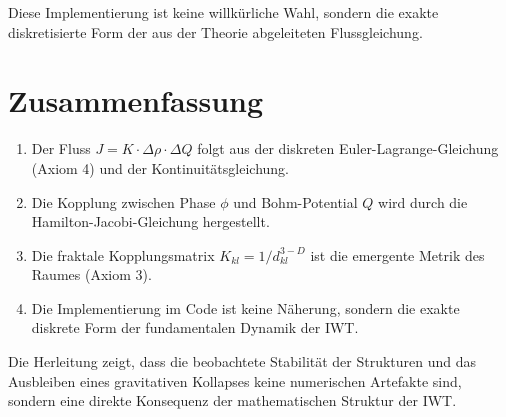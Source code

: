 Diese Implementierung ist keine willkürliche Wahl, sondern die exakte diskretisierte Form 
der aus der Theorie abgeleiteten Flussgleichung.

\section{Zusammenfassung}

\begin{enumerate}
    \item Der Fluss \( J = K \cdot \Delta \rho \cdot \Delta Q \) folgt aus der 
    diskreten Euler-Lagrange-Gleichung (Axiom 4) und der Kontinuitätsgleichung.
    \item Die Kopplung zwischen Phase \( \phi \) und Bohm-Potential \( Q \) 
    wird durch die Hamilton-Jacobi-Gleichung hergestellt.
    \item Die fraktale Kopplungsmatrix \( K_{kl} = 1/d_{kl}^{3-D} \) ist die 
    emergente Metrik des Raumes (Axiom 3).
    \item Die Implementierung im Code ist keine Näherung, sondern die exakte 
    diskrete Form der fundamentalen Dynamik der IWT.
\end{enumerate}

Die Herleitung zeigt, dass die beobachtete Stabilität der Strukturen und das 
Ausbleiben eines gravitativen Kollapses keine numerischen Artefakte sind, 
sondern eine direkte Konsequenz der mathematischen Struktur der IWT.